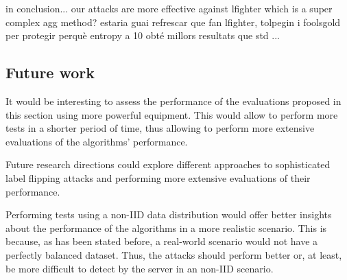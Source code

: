 in conclusion... our attacks are more effective against lfighter which is a super complex agg method?
estaria guai refrescar que fan lfighter, tolpegin i foolsgold per protegir perquè entropy a 10 obté millors resultats que std
...\\

\subsection{Future work}
It would be interesting to assess the performance of the evaluations proposed in this section using more powerful equipment. This would allow to perform more tests in a shorter period of time, thus allowing to perform more extensive evaluations of the algorithms' performance.

Future research directions could explore different approaches to sophisticated label flipping attacks and performing more extensive evaluations of their performance.

Performing tests using a non-IID data distribution would offer better insights about the performance of the algorithms in a more realistic scenario.
This is because, as has been stated before, a real-world scenario would not have a perfectly balanced dataset. Thus, the attacks should perform better or, at least, be more difficult to detect by the server in an non-IID scenario.
\pagebreak